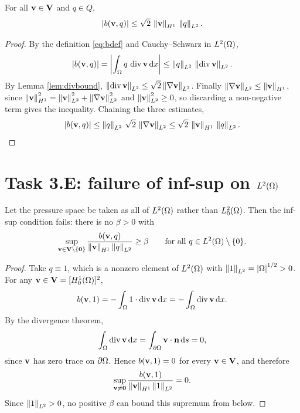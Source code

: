 \documentclass[11pt,a4paper]{article}
\newcommand{\Vsp}{\mathbf{V}}
\newcommand{\Qsp}{Q}
\newcommand{\bzero}{\mathbf{0}}
\begin{document}
\begin{proposition}[Boundedness of $b$]\label{prop:bbounded}
For all $\bv \in \Vsp$ and $q \in \Qsp$,
\[
  \left\lvert b(\mathbf{v},q) \right\rvert \le \sqrt{2}\, \left\lVert \mathbf{v} \right\rVert_{H^{1}}\, \left\lVert q \right\rVert_{L^{2}} .
\]
\end{proposition}

\begin{proof}
By the definition \eqref{eq:bdef} and Cauchy--Schwarz in $L^{2}(\Omega)$,
\[
  \left\lvert b(\mathbf{v},q) \right\rvert = \left\lvert \int_\Omega q \,\operatorname{div} \mathbf{v} \,\mathrm{d}x \right\rvert
  \le \left\lVert q \right\rVert_{L^{2}}\,\left\lVert \operatorname{div} \mathbf{v} \right\rVert_{L^{2}} .
\]
By Lemma \ref{lem:divbound}, $\left\lVert \operatorname{div} \mathbf{v} \right\rVert_{L^{2}} \le \sqrt{2}\left\lVert \nabla \mathbf{v} \right\rVert_{L^{2}}$.
Finally $\left\lVert \nabla \mathbf{v} \right\rVert_{L^{2}} \le \left\lVert \mathbf{v} \right\rVert_{H^{1}}$, since
$\left\lVert \mathbf{v} \right\rVert_{H^{1}}^{2} = \left\lVert \mathbf{v} \right\rVert_{L^{2}}^{2} + \left\lVert \nabla \mathbf{v} \right\rVert_{L^{2}}^{2}$ and
$\left\lVert \mathbf{v} \right\rVert_{L^{2}}^{2} \ge 0$, so discarding a non-negative term gives the inequality.
Chaining the three estimates,
\[
  \left\lvert b(\mathbf{v},q) \right\rvert \le \left\lVert q \right\rVert_{L^{2}}\,\sqrt{2}\,\left\lVert \nabla \mathbf{v} \right\rVert_{L^{2}}
  \le \sqrt{2}\,\left\lVert \mathbf{v} \right\rVert_{H^{1}}\,\left\lVert q \right\rVert_{L^{2}} . \qedhere
\]
\end{proof}

\section{Task 3.E: failure of inf-sup on $L^{2}(\Omega)$}

\begin{proposition}\label{prop:infsupfails}
Let the pressure space be taken as all of $L^{2}(\Omega)$ rather than $L^{2}_{0}(\Omega)$. Then
the inf-sup condition fails: there is no $\beta > 0$ with
\[
  \sup_{\bv \in \Vsp \setminus \{\bzero\}}
  \frac{b(\bv,q)}{\normH{\bv}\normL{q}} \ge \beta
  \qquad \text{for all } q \in \Ltwo \setminus \{0\} .
\]
\end{proposition}

\begin{proof}
Take $q \equiv 1$, which is a nonzero element of $L^{2}(\Omega)$ with
$\left\lVert 1 \right\rVert_{L^{2}} = \left\lvert \Omega \right\rvert^{1/2} > 0$. For any $\bv \in \Vsp = [\Honezero]^{2}$,
\[
  b(\mathbf{v}, 1) = -\int_\Omega 1 \cdot \operatorname{div} \mathbf{v} \,\mathrm{d}x = - \int_\Omega \operatorname{div} \mathbf{v} \,\mathrm{d}x .
\]
By the divergence theorem,
\[
  \int_\Omega \operatorname{div} \mathbf{v} \,\mathrm{d}x = \int_{\partial\Omega} \mathbf{v} \cdot \mathbf{n} \,\mathrm{d}s = 0 ,
\]
since $\mathbf{v}$ has zero trace on $\partial\Omega$. Hence $b(\mathbf{v},1) = 0$ for every
$\bv \in \Vsp$, and therefore
\[
  \sup_{\bv \neq \bzero} \frac{b(\bv,1)}{\normH{\bv}\normL{1}} = 0 .
\]
Since $\left\lVert 1 \right\rVert_{L^{2}} > 0$, no positive $\beta$ can bound this supremum from below.
\end{proof}
\end{document}
